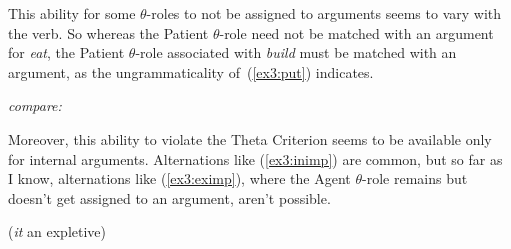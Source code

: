 This ability for some $\theta$-roles to not be assigned to arguments seems to vary with the verb. So whereas the Patient $\theta$-role need not be matched with an argument for \emph{eat}, the Patient $\theta$-role associated with \emph{build} must be matched with an argument, as the ungrammaticality of~(\ref{ex3:put}) indicates.
\begin{exe}
	\raggedright
	\sn \emph{compare:}
\end{exe}
Moreover, this ability to violate the Theta Criterion seems to be available only for internal arguments. Alternations like (\ref{ex3:inimp}) are common, but so far as I know, alternations like (\ref{ex3:eximp}), where the Agent $\theta$-role remains but doesn't get assigned to an argument, aren't possible.
\begin{exe}
	\raggedright
	\ex \label{ex3:inimp} 
	\begin{xlist}
	\end{xlist}
	\ex \label{ex3:eximp}
	\begin{xlist}
		\ex[]{Shai danced.}
		 (\emph{it} an expletive)
	\end{xlist}
\end{exe}

